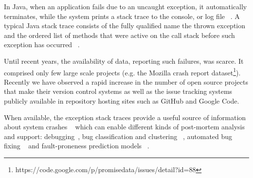 \documentclass[conference]{IEEEtran}
\begin{document}

In Java, when an application fails due to an uncaught exception, 
it automatically terminates, while the system prints a stack trace to the console, 
or log file ~\cite{gosling2000java}.  A typical Java stack trace consists of  the fully qualified name 
the thrown exception and the ordered list of methods that were active on the call stack before 
such exception has occurred ~\cite{gosling2000java,bloch2008effective}.




Until recent years, the availability of data, reporting such failures, was scarce. 
It comprised only few large scale projects (e.g. the Mozilla crash report dataset\footnote{https://code.google.com/p/promisedata/issues/detail?id=88}).
Recently we have observed a rapid increase in the number of open
source projects that make their version control systems as well as the issue tracking systems
publicly available in repository hosting sites such as GitHub and Google Code.

When available, the exception stack traces provide a useful source of information about system crashes ~\cite{bettenburg2008makes} which 
 can enable different kinds of post-mortem analysis and support:  debugging~\cite{schroter2010stack}, 
 bug classification and clustering ~\cite{wang2013improving, kim2011crash, dhaliwal2011classifying},  
automated bug fixing ~\cite{sinha2009fault} and fault-proneness prediction models ~\cite{kim2013predicting}. 
\end{document}

